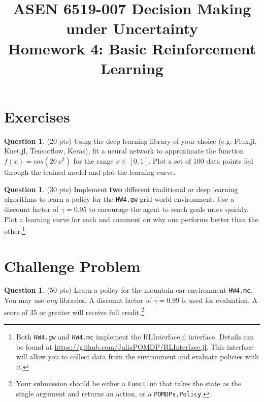 \documentclass{article}
\title{ASEN 6519-007 Decision Making under Uncertainty\\
       Homework 4: Basic Reinforcement Learning}
\theoremstyle{definition}
\newtheorem{question}[thm]{Question}
\begin{document}
\maketitle

\section{Exercises}

\begin{question}
    (20 pts) Using the deep learning library of your choice (e.g. Flux.jl, Knet.jl, Tensorflow, Keras), fit a neural network to approximate the function $f(x) = cos(20\,x^2)$ for the range $x \in [0,1]$. Plot a set of 100 data points fed through the trained model and plot the learning curve.
\end{question}

\begin{question}
    (30 pts) Implement \textbf{two} different traditional or deep learning algorithms to learn a policy for the \texttt{HW4.gw} grid world environment. Use a discount factor of $\gamma=0.95$ to encourage the agent to reach goals more quickly. Plot a learning curve for each and comment on why one performs better than the other.\footnote{\label{fn:rlinterface}Both \texttt{HW4.gw} and \texttt{HW4.mc} implement the RLInterface.jl interface. Details can be found at \url{https://github.com/JuliaPOMDP/RLInterface.jl}. This interface will allow you to collect data from the environment and evaluate policies with it.}
\end{question}

\section{Challenge Problem}

\begin{question}
    (50 pts) Learn a policy for the mountain car environment \texttt{HW4.mc}. You may use \emph{any} libraries. A discount factor of $\gamma=0.99$ is used for evaluation. A score of 35 or greater will receive full credit.\footnotemark[1]\footnote{Your submission should be either a \texttt{Function} that takes the state as the single argument and returns an action, or a \texttt{POMDPs.Policy}.}
\end{question}
\end{document}
